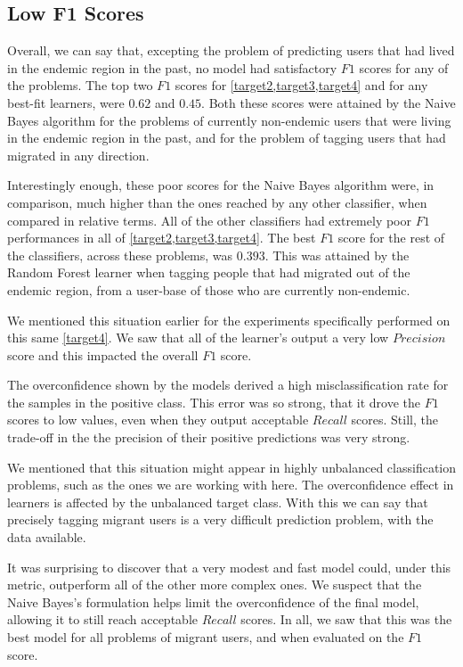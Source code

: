 \subsection{Low F1 Scores}\label{subsec:master_table_low_f1}

Overall, we can say that, excepting the problem of predicting users that had lived in the endemic region in the past, no model had satisfactory $F1$ scores for any of the problems. The top two $F1$ scores for \cref{target2,target3,target4} and for any best-fit learners, were $0.62$ and $0.45$.
Both these scores were attained by the Naive Bayes algorithm for the problems of currently non-endemic users that were living in the endemic region in the past, and for the problem of tagging users that had migrated in any direction.

Interestingly enough, these poor scores for the Naive Bayes algorithm were, in comparison, much higher than the ones reached by any other classifier, when compared in relative terms.
All of the other classifiers had extremely poor $F1$ performances in all of \cref{target2,target3,target4}.
The best $F1$ score for the rest of the classifiers, across these problems, was $0.393$.
This was attained by the Random Forest learner when tagging people that had migrated out of the endemic region, from a user-base of those who are currently non-endemic.

We mentioned this situation earlier for the experiments specifically performed on this same \cref{target4}.
We saw that all of the learner's output a very low $Precision$ score and this impacted the overall $F1$ score.

The overconfidence shown by the models derived a high misclassification rate for the samples in the positive class.
This error was so strong, that it drove the $F1$ scores to low values, even when they output acceptable $Recall$ scores.
Still, the trade-off in the the precision of their positive predictions was very strong.

We mentioned that this situation might appear in highly unbalanced classification problems, such as the ones we are working with here.
The overconfidence effect in learners is affected by the unbalanced target class.
With this we can say that precisely tagging migrant users is a very difficult prediction problem, with the data available.

It was surprising to discover that a very modest and fast model could, under this metric, outperform all of the other more complex ones.
We suspect that the Naive Bayes's formulation helps limit the overconfidence of the final model, allowing it to still reach acceptable $Recall$ scores.
In all, we saw that this was the best model for all problems of migrant users, and when evaluated on the $F1$ score.

